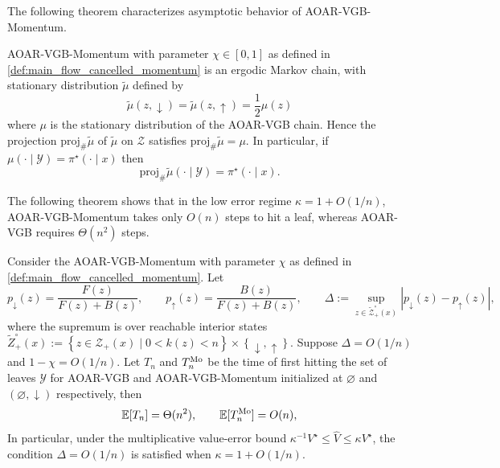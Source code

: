 \documentclass{article}
\numberwithin{theorem}{section}
\numberwithin{proposition}{section}
\numberwithin{corollary}{section}
\numberwithin{lemma}{section}
\numberwithin{conjecture}{section}
\numberwithin{remark}{section}
\numberwithin{definition}{section}
\numberwithin{assumption}{section}
\numberwithin{example}{section}
\newcommand{\calY}{{\mathcal{Y}}}
\newcommand{\calZ}{{\mathcal{Z}}}
\newcommand{\mbra}[1]{\left\{#1\right\}}
\newcommand{\abs}[1]{\left| #1\right|}
\begin{document}
 The following theorem characterizes asymptotic behavior of AOAR-VGB-Momentum.
\begin{theorem}
\label{thm:main_momentum_stationarity}
AOAR-VGB-Momentum with parameter $\chi\in[0,1]$ as defined in \cref{def:main_flow_cancelled_momentum} is an ergodic Markov chain, with stationary distribution $\widetilde\mu $ defined by 
\begin{equation*}
    \widetilde\mu(z,\downarrow)
    =
    \widetilde\mu(z,\uparrow)
    =
    \frac12\mu(z)
\end{equation*}
where $\mu$ is the stationary distribution of the AOAR-VGB chain. Hence the projection $\mathrm{proj}_{\#}\widetilde\mu$ of $\tilde{\mu}$ on $\calZ$  satisfies $\mathrm{proj}_{\#}\widetilde\mu=\mu$. In particular, if $ \mu(\cdot\mid\calY) = \pi^\star(\cdot\mid x)$ then
\begin{equation*}
    \mathrm{proj}_{\#}\widetilde\mu(\cdot\mid\calY)
    =
    \pi^\star(\cdot\mid x).
\end{equation*}
\end{theorem}
The following theorem shows that in the low error regime $\kappa = 1+O(1/n)$, AOAR-VGB-Momentum takes only $O(n)$ steps to hit a leaf, whereas AOAR-VGB requires $\Theta(n^2)$ steps.
\begin{theorem}
\label{thm:main_momentum_hitting}
Consider the AOAR-VGB-Momentum with parameter $\chi$ as defined in \cref{def:main_flow_cancelled_momentum}.
Let
\begin{equation*}
    p_\downarrow(z)=\frac{F(z)}{F(z)+B(z)},
    \qquad
    p_\uparrow(z)=\frac{B(z)}{F(z)+B(z)},
    \qquad
    \Delta:=\sup_{z \in \tilde{\calZ}_+^\circ(x)} \abs{p_\downarrow(z)-p_\uparrow(z)},
\end{equation*}
where the supremum is over reachable interior states $ \tilde{Z}_+^\circ (x) := \mbra{z\in \calZ_+(x) \mid 0<k(z)<n} \times \mbra{\downarrow, \uparrow}.$
Suppose $\Delta=O(1/n)$ and $1-\chi=O(1/n)$. Let $T_n$ and $T_n^{\rm Mo}$ be the time of first hitting the set of leaves $\calY$ for AOAR-VGB and AOAR-VGB-Momentum initialized at $ \varnothing$ and $(\varnothing,\downarrow)$ respectively, then
\begin{equation*}
    \mathbb E[T_n]=\Theta(n^2),
    \qquad
    \mathbb E[T_n^{\rm Mo}]=O(n),
\end{equation*}
In particular, under the multiplicative value-error bound $\kappa^{-1}V^\star\le\widehat V\le\kappa V^\star$, the condition $\Delta=O(1/n)$ is satisfied when $\kappa=1+O(1/n)$.
\end{theorem}
\end{document}
